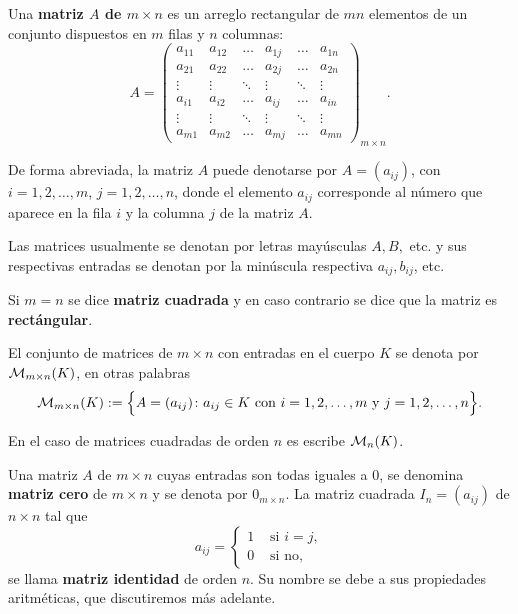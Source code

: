 \begin{defin}
Una \textbf{matriz $A$ de $m \times n$} es un arreglo rectangular de $mn$ elementos de un conjunto dispuestos en $m$ filas y $n$ columnas:
\[A=\left(\begin{array}{cccccc}
     a_{11}& a_{12} & \dots & a_{1j} &\dots & a_{1n}\\
     a_{21}& a_{22} & \dots &a_{2j} &\dots & a_{2n}\\
     \vdots&  \vdots & \ddots &  \vdots &\ddots &  \vdots\\
     a_{i1}& a_{i2} & \dots &a_{ij} &\dots & a_{in}\\
     \vdots&  \vdots & \ddots & \vdots &\ddots &  \vdots\\
     a_{m1}& a_{m2} & \dots & a_{mj} &\dots & a_{mn}
\end{array}\right)_{m\times n}.\]





De forma abreviada, la matriz $A$ puede denotarse por $A=(a_{ij})$, con $i=1,2,\dots, m$, $j=1,2,\dots, n$, donde el elemento $a_{ij}$ corresponde al número que aparece en la fila $i$ y la columna $j$ de la matriz $A$.

Las matrices usualmente se denotan por letras mayúsculas $A, B,$ etc. y sus respectivas entradas se denotan por la minúscula respectiva $a_{ij}, b_{ij}$, etc.

Si $m =n$ se dice \textbf{matriz cuadrada} y en caso contrario se dice que la matriz es \textbf{rect\'angular}.

El conjunto de matrices de $m\times n$ con entradas en el cuerpo $K$ se denota por $\mathcal{M}_{m\times n}(K)$, en otras palabras
\[\mathcal{M}_{m\times n}(K):=\Big\{A=(a_{ij}) \colon a_{ij}\in K \text{ con $i=1,2,\dots, m$ y $j=1,2,\dots, n$}\Big\}.\]
\end{defin}
En el caso de matrices cuadradas de orden $n$ es escribe $\mathcal{M}_n(K)$.


Una matriz $A$ de $m \times n$ cuyas entradas son todas  iguales a 0, se denomina \textbf{matriz cero} de $m \times n$ y se denota por $0_{m\times n}$.
La matriz cuadrada $I_n=(a_{ij})$ de $n\times n$ tal que 
\[a_{ij}=\left\{\begin{array}{ll}
    1 & \text{ si } i= j, \\
   0 & \text{ si no},
\end{array}\right.\]
se llama \textbf{matriz identidad} de orden $n$. Su nombre se debe a sus propiedades aritm\'eticas, que discutiremos m\'as adelante.

